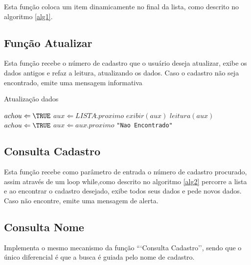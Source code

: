 \documentclass[12pt]{article}
\begin{document}
Esta função coloca um item dinamicamente no final da lista, como descrito no algoritmo \ref{alg1}.



\subsection{Função Atualizar}

Esta função recebe o número de cadastro que o usuário deseja atualizar,
exibe os dados antigos e refaz a leitura, atualizando os dados. Caso
o cadastro não seja encontrado, emite uma mensagem informativa


\begin{algorithm}                      %
\caption{Atualização dados}          %
\label{alg2}                           %
\begin{algorithmic}                    %
    \STATE $achou \Leftarrow \TRUE$
    \STATE $aux \Leftarrow LISTA\hat.proximo$
        \STATE $exibir(aux)$
        \STATE $leitura(aux)$
        \STATE $achou \Leftarrow \TRUE$
      \ENDIF  
    \STATE $aux \Leftarrow aux\hat.proximo$
    \ENDWHILE
      \PRINT \texttt{"Nao Encontrado"}
    \ENDIF
\end{algorithmic}
\end{algorithm}  


\subsection{Consulta Cadastro}

Esta função recebe como parâmetro de entrada o número de cadastro procurado, assim
através de um loop while,como descrito no algoritmo \ref{alg2} percorre a lista e ao encontrar o cadastro desejado, exibe
todos seus dados e pede novos dados. Caso não encontre, emite uma mensagem de alerta. 

\subsection{Consulta Nome}

Implementa o mesmo mecanismo da função ```Consulta Cadastro'', sendo que o único diferencial
é que a busca é guiada pelo nome de cadastro.
\end{document}
